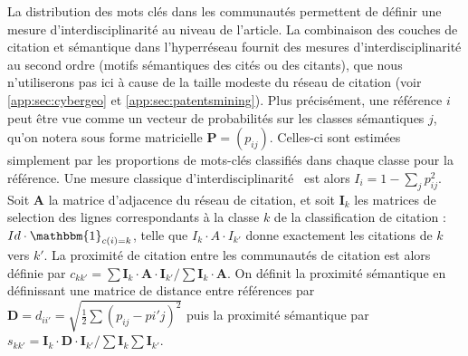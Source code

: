 {La distribution des mots clés dans les communautés permettent de définir une mesure d'interdisciplinarité au niveau de l'article. La combinaison des couches de citation et sémantique dans l'hyperréseau fournit des mesures d'interdisciplinarité au second ordre (motifs sémantiques des cités ou des citants), que nous n'utiliserons pas ici à cause de la taille modeste du réseau de citation (voir \ref{app:sec:cybergeo} et \ref{app:sec:patentsmining}). Plus précisément, une référence $i$ peut être vue comme un vecteur de probabilités sur les classes sémantiques $j$, qu'on notera sous forme matricielle $\mathbf{P}=(p_{ij})$. Celles-ci sont estimées simplement par les proportions de mots-clés classifiés dans chaque classe pour la référence. Une mesure classique d'interdisciplinarité~\cite{bergeaud2017classifying} est alors $I_i = 1 - \sum_j p_{ij}^2$. Soit $\mathbf{A}$ la matrice d'adjacence du réseau de citation, et soit $\mathbf{I}_k$ les matrices de selection des lignes correspondants à la classe $k$ de la classification de citation : $Id\cdot \mathbbm{1}_{c(i)=k}$, telle que $I_k \cdot A \cdot I_{k'}$ donne exactement les citations de $k$ vers $k'$. La proximité de citation entre les communautés de citation est alors définie par $c_{kk'} = \sum \mathbf{I}_k \cdot \mathbf{A} \cdot \mathbf{I}_{k'} /  \sum \mathbf{I}_k \cdot \mathbf{A}$. On définit la proximité sémantique en définissant une matrice de distance entre références par $\mathbf{D} = d_{ii'}=\sqrt{\frac{1}{2}\sum (p_{ij}-p{i'j})^2}$ puis la proximité sémantique par $s_{kk'} = \mathbf{I}_k \cdot \mathbf{D} \cdot \mathbf{I}_{k'} / \sum \mathbf{I}_k \sum \mathbf{I}_{k'}$.
}



